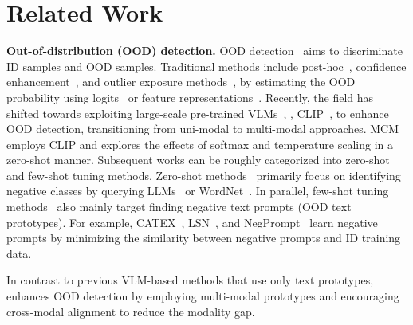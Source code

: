 \section{Related Work}

\textbf{Out-of-distribution (OOD) detection.}
OOD detection~\cite{hendrycks_baseline_2017,huang_importance_2021,liu_energy-based_2020,yang_openood_2022,zhang_openood_2023} aims to discriminate ID samples and OOD samples. 
Traditional methods include post-hoc~\cite{sun_react_2021,lee_simple_2018,park_nearest_2023,sun_out--distribution_2022}, confidence enhancement~\cite{devries_learning_2018,hein_why_2019,wei_mitigating_2022,xu_vra_2023,narasimhan_plugin_2023}, and outlier exposure methods~\cite{hendrycks_deep_2018,jiang_dos_2023,du_dream_2023,kieuOutlierDetectionMultidimensional2018,huang_mos_2021,liu_residual_2023,zhou_learning_2021,fort_exploring_2021}, by estimating the OOD probability using logits~\cite{hendrycks_baseline_2017,huang_importance_2021,liu_energy-based_2020,liang_enhancing_2020} or feature representations~\cite{Wang_2022_CVPR,sun_react_2021}. 
Recently, the field has shifted towards exploiting large-scale pre-trained VLMs~\cite{radford_learning_2021,girdhar_imagebind_2023,Hess_2024_WACV}, \ie, CLIP~\cite{radford_learning_2021}, to enhance OOD detection, transitioning from uni-modal to multi-modal approaches. 
MCM~\cite{ming2022delving}
employs CLIP and explores the effects of softmax and temperature scaling in a zero-shot manner. 
Subsequent works can be roughly categorized into zero-shot and few-shot tuning methods. 
Zero-shot methods~\cite{ming2022delving,jiang2024negative,cao_envisioning_2024,wang_clipn_2023} primarily focus on identifying negative classes by querying LLMs~\cite{khattab_colbert_2020,openai_gpt-4_2023} or WordNet~\cite{DBLP:journals/cacm/Miller95}. 
In parallel, few-shot tuning methods~\cite{liu_category-extensible_2023,li_learning_2024,zhang_lapt_2024,bai_id-like_2024,nie_out--distribution_2024} also mainly target finding negative text prompts (OOD text prototypes). 
For example, CATEX~\cite{liu_category-extensible_2023}, LSN~\cite{nie_out--distribution_2024}, and NegPrompt~\cite{li_learning_2024} learn negative prompts by minimizing the similarity between negative prompts and ID training data. 

In contrast to previous VLM-based methods that use only text prototypes, \ours enhances OOD detection by employing multi-modal prototypes and encouraging cross-modal alignment
to reduce the modality gap. 


